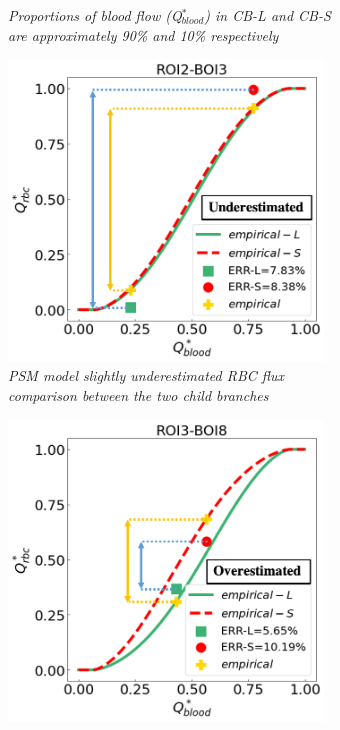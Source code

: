 \begin{figure}[H]
\begin{subfigure}{0.48 \textwidth}
    \caption{\textit{Proportions of blood flow (Q$^{*}_{blood}$) in CB-L and CB-S are approximately 90\% and 10\% respectively} \label{DeviationsPSM2}}
\end{subfigure}
\hfill
\begin{subfigure}{0.48 \textwidth}
    \includegraphics[width=0.92\textwidth]{images/DeviationsPSM3.png}
    \caption{\textit{PSM model slightly underestimated RBC flux comparison between the two child branches} \label{DeviationsPSM3}}
\end{subfigure}
\hfill
\begin{subfigure}{0.48 \textwidth}
    \includegraphics[width=0.92\textwidth]{images/DeviationsPSM4.png}

\end{subfigure}
\end{figure}
